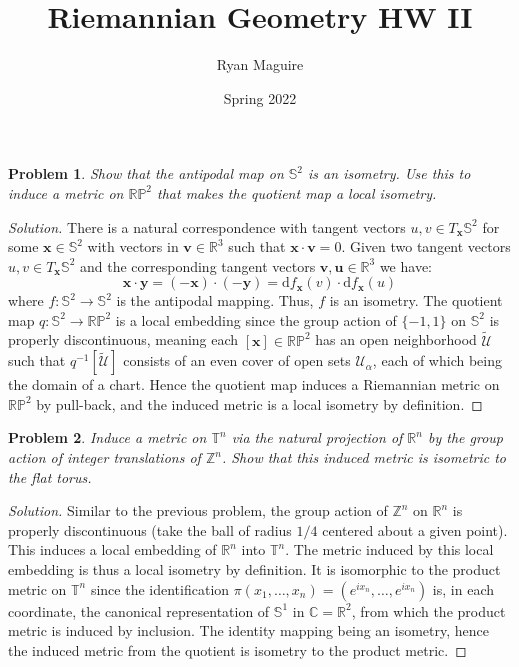 \documentclass{article}
\title{Riemannian Geometry HW II}
\author{Ryan Maguire}
\date{Spring 2022}
\theoremstyle{normal}
\newtheorem{problem}{Problem}
\begin{document}
    \maketitle
    \begin{problem}
        Show that the antipodal map on $\mathbb{S}^{2}$ is an isometry.
        Use this to induce a metric on $\mathbb{RP}^{2}$ that makes the
        quotient map a local isometry.
    \end{problem}
    \begin{proof}[Solution]
        There is a natural correspondence with tangent vectors
        $u,v\in{T}_{\mathbf{x}}\mathbb{S}^{2}$ for some
        $\mathbf{x}\in\mathbb{S}^{2}$ with vectors in
        $\mathbf{v}\in\mathbb{R}^{3}$ such that
        $\mathbf{x}\cdot\mathbf{v}=0$. Given two tangent vectors
        $u,v\in{T}_{\mathbf{x}}\mathbb{S}^{2}$ and the corresponding
        tangent vectors $\mathbf{v},\mathbf{u}\in\mathbb{R}^{3}$ we have:
        \begin{equation}
            \mathbf{x}\cdot\mathbf{y}
            =(-\mathbf{x})\cdot(-\mathbf{y})
            =\textrm{d}f_{\mathbf{x}}(v)\cdot\textrm{d}f_{\mathbf{x}}(u)
        \end{equation}
        where $f:\mathbb{S}^{2}\rightarrow\mathbb{S}^{2}$ is the antipodal
        mapping. Thus, $f$ is an isometry. The quotient map
        $q:\mathbb{S}^{2}\rightarrow\mathbb{RP}^{2}$ is a local embedding since
        the group action of $\{-1,1\}$ on $\mathbb{S}^{2}$ is properly
        discontinuous, meaning each $[\mathbf{x}]\in\mathbb{RP}^{2}$ has an
        open neighborhood $\tilde{\mathcal{U}}$ such that
        $q^{-1}[\tilde{\mathcal{U}}]$ consists of an even cover of open sets
        $\mathcal{U}_{\alpha}$, each of which being the domain of a chart.
        Hence the quotient map induces a Riemannian metric on $\mathbb{RP}^{2}$
        by pull-back, and the induced metric is a local isometry by definition.
    \end{proof}
    \begin{problem}
        Induce a metric on $\mathbb{T}^{n}$ via the natural projection of
        $\mathbb{R}^{n}$ by the group action of integer translations of
        $\mathbb{Z}^{n}$. Show that this induced metric is isometric to the
        flat torus.
    \end{problem}
    \begin{proof}[Solution]
        Similar to the previous problem, the group action of
        $\mathbb{Z}^{n}$ on $\mathbb{R}^{n}$ is properly discontinuous
        (take the ball of radius $1/4$ centered about a given point). This
        induces a local embedding of $\mathbb{R}^{n}$ into $\mathbb{T}^{n}$.
        The metric induced by this local embedding is thus a local isometry
        by definition. It is isomorphic to the product metric on
        $\mathbb{T}^{n}$ since the identification
        $\pi(x_{1},\dots,x_{n})=(e^{ix_{n}},\dots,e^{ix_{n}})$ is, in each
        coordinate, the canonical representation of $\mathbb{S}^{1}$ in
        $\mathbb{C}=\mathbb{R}^{2}$, from which the product metric is induced
        by inclusion. The identity mapping being an isometry, hence the induced
        metric from the quotient is isometry to the product metric.
    \end{proof}
\end{document}
